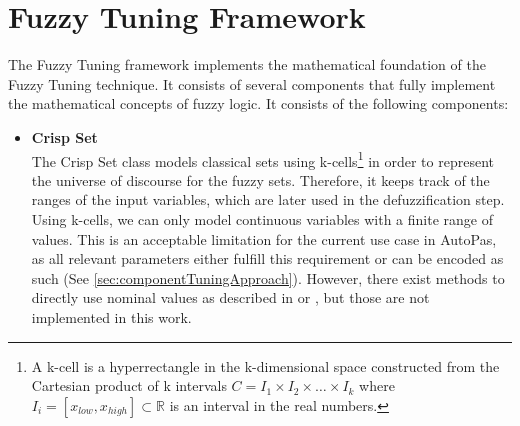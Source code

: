 \section{Fuzzy Tuning Framework}

The Fuzzy Tuning framework implements the mathematical foundation of the Fuzzy Tuning technique. It consists of several components that fully implement the mathematical concepts of fuzzy logic. It consists of the following components:

\begin{itemize}
  \item \textbf{Crisp Set}\\
        The Crisp Set class models classical sets using k-cells\footnote{A k-cell is a hyperrectangle in the k-dimensional space constructed from the Cartesian product of k intervals $C = I_1 \times I_2 \times \ldots \times I_k$ where $I_i = [x_{low}, x_{high}] \subset \mathbb{R} $ is an interval in the real numbers.} in order to represent the universe of discourse for the fuzzy sets. Therefore, it keeps track of the ranges of the input variables, which are later used in the defuzzification step.
        Using k-cells, we can only model continuous variables with a finite range of values. This is an acceptable limitation for the current use case in AutoPas, as all relevant parameters either fulfill this requirement or can be encoded as such (See \autoref{sec:componentTuningApproach}). However, there exist methods to directly use nominal values as described in \cite{ReydelCastillo2012} or \cite{Jodoin2006}, but those are not implemented in this work.\\



\end{itemize}
